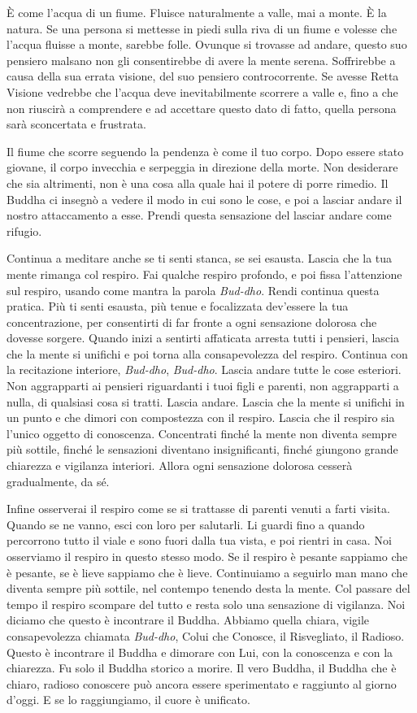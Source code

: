 È come l'acqua di un fiume. Fluisce naturalmente a valle, mai a monte. È
la natura. Se una persona si mettesse in piedi sulla riva di un fiume e
volesse che l'acqua fluisse a monte, sarebbe folle. Ovunque si trovasse
ad andare, questo suo pensiero malsano non gli consentirebbe di avere la
mente serena. Soffrirebbe a causa della sua errata visione, del suo
pensiero controcorrente. Se avesse Retta Visione vedrebbe che l'acqua
deve inevitabilmente scorrere a valle e, fino a che non riuscirà a
comprendere e ad accettare questo dato di fatto, quella persona sarà
sconcertata e frustrata.

Il fiume che scorre seguendo la pendenza è come il tuo corpo. Dopo
essere stato giovane, il corpo invecchia e serpeggia in direzione della
morte. Non desiderare che sia altrimenti, non è una cosa alla quale hai
il potere di porre rimedio. Il Buddha ci insegnò a vedere il modo in cui
sono le cose, e poi a lasciar andare il nostro attaccamento a esse.
Prendi questa sensazione del lasciar andare come rifugio.

Continua a meditare anche se ti senti stanca, se sei esausta. Lascia che
la tua mente rimanga col respiro. Fai qualche respiro profondo, e poi
fissa l'attenzione sul respiro, usando come mantra la parola
\emph{Bud-dho}. Rendi continua questa pratica. Più ti senti esausta, più
tenue e focalizzata dev'essere la tua concentrazione, per consentirti di
far fronte a ogni sensazione dolorosa che dovesse sorgere. Quando inizi
a sentirti affaticata arresta tutti i pensieri, lascia che la mente si
unifichi e poi torna alla consapevolezza del respiro. Continua con la
recitazione interiore, \emph{Bud-dho}, \emph{Bud-dho}. Lascia andare
tutte le cose esteriori. Non aggrapparti ai pensieri riguardanti i tuoi
figli e parenti, non aggrapparti a nulla, di qualsiasi cosa si tratti.
Lascia andare. Lascia che la mente si unifichi in un punto e che dimori
con compostezza con il respiro. Lascia che il respiro sia l'unico
oggetto di conoscenza. Concentrati finché la mente non diventa sempre
più sottile, finché le sensazioni diventano insignificanti, finché
giungono grande chiarezza e vigilanza interiori. Allora ogni sensazione
dolorosa cesserà gradualmente, da sé.

Infine osserverai il respiro come se si trattasse di parenti venuti a
farti visita. Quando se ne vanno, esci con loro per salutarli. Li guardi
fino a quando percorrono tutto il viale e sono fuori dalla tua vista, e
poi rientri in casa. Noi osserviamo il respiro in questo stesso modo. Se
il respiro è pesante sappiamo che è pesante, se è lieve sappiamo che è
lieve. Continuiamo a seguirlo man mano che diventa sempre più sottile,
nel contempo tenendo desta la mente. Col passare del tempo il respiro
scompare del tutto e resta solo una sensazione di vigilanza. Noi diciamo
che questo è incontrare il Buddha. Abbiamo quella chiara, vigile
consapevolezza chiamata \emph{Bud-dho}, Colui che Conosce, il
Risvegliato, il Radioso. Questo è incontrare il Buddha e dimorare con
Lui, con la conoscenza e con la chiarezza. Fu solo il Buddha storico a
morire. Il vero Buddha, il Buddha che è chiaro, radioso conoscere può
ancora essere sperimentato e raggiunto al giorno d'oggi. E se lo
raggiungiamo, il cuore è unificato.

